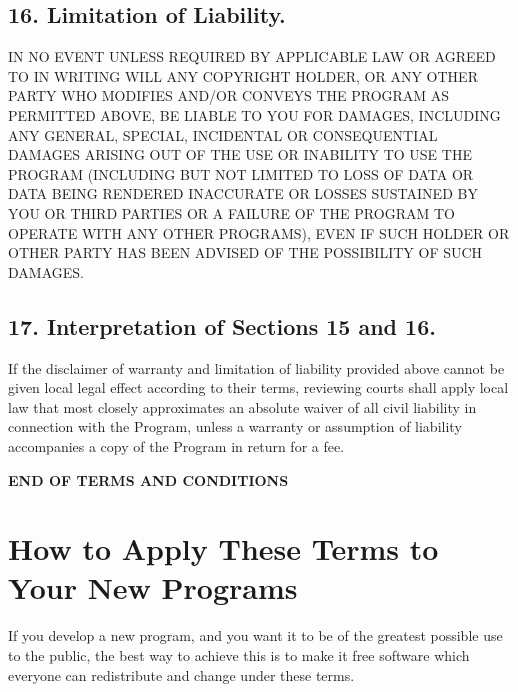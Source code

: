 \documentclass[letterpaper,10pt,english]{sphinxmanual}
\begin{document}
\subsection{16. Limitation of Liability.}
\label{license:limitation-of-liability}
IN NO EVENT UNLESS REQUIRED BY APPLICABLE LAW OR AGREED TO IN WRITING
WILL ANY COPYRIGHT HOLDER, OR ANY OTHER PARTY WHO MODIFIES AND/OR CONVEYS
THE PROGRAM AS PERMITTED ABOVE, BE LIABLE TO YOU FOR DAMAGES, INCLUDING ANY
GENERAL, SPECIAL, INCIDENTAL OR CONSEQUENTIAL DAMAGES ARISING OUT OF THE
USE OR INABILITY TO USE THE PROGRAM (INCLUDING BUT NOT LIMITED TO LOSS OF
DATA OR DATA BEING RENDERED INACCURATE OR LOSSES SUSTAINED BY YOU OR THIRD
PARTIES OR A FAILURE OF THE PROGRAM TO OPERATE WITH ANY OTHER PROGRAMS),
EVEN IF SUCH HOLDER OR OTHER PARTY HAS BEEN ADVISED OF THE POSSIBILITY OF
SUCH DAMAGES.


\subsection{17. Interpretation of Sections 15 and 16.}
\label{license:interpretation-of-sections-15-and-16}
If the disclaimer of warranty and limitation of liability provided
above cannot be given local legal effect according to their terms,
reviewing courts shall apply local law that most closely approximates
an absolute waiver of all civil liability in connection with the
Program, unless a warranty or assumption of liability accompanies a
copy of the Program in return for a fee.

\textbf{END OF TERMS AND CONDITIONS}


\section{How to Apply These Terms to Your New Programs}
\label{license:how-to-apply-these-terms-to-your-new-programs}
If you develop a new program, and you want it to be of the greatest
possible use to the public, the best way to achieve this is to make it
free software which everyone can redistribute and change under these terms.
\end{document}
